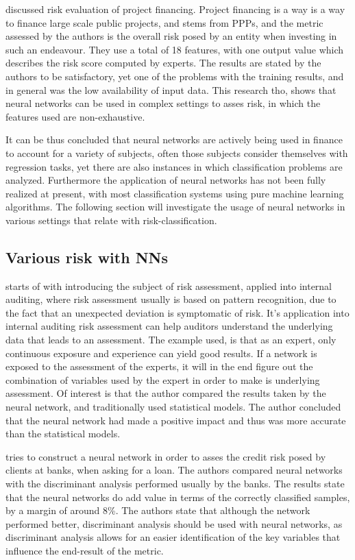 \documentclass[12pt]{article}
\begin{document}
\cite{04443437.pdf} discussed risk evaluation of project financing. Project financing is a way is a way to finance large scale public projects, and stems from PPPs, and the metric assessed by the authors is the overall risk posed by an entity when investing in such an endeavour. They use a total of 18 features, with one output value which describes the risk score computed by experts. The results are stated by the authors to be satisfactory, yet one of the problems with the training results, and in general was the low availability of input data. This research tho, shows that neural networks can be used in complex settings to asses risk, in which the features used are non-exhaustive.

It can be thus concluded that neural networks are actively being used in finance to account for a variety of subjects, often those subjects consider themselves with regression tasks, yet there are also instances in which classification problems are analyzed. Furthermore the application of neural networks has not been fully realized at present, with most classification systems using pure machine learning algorithms. The following section will investigate the usage of neural networks in various settings that relate with risk-classification.

\subsection{Various risk with NNs}
\label{sub:various_risk_nn}

\cite{riskAssesmentInternalAuditing} starts of with introducing the subject of risk assessment, applied into internal auditing, where risk assessment usually is based on pattern recognition, due to the fact that an unexpected deviation is symptomatic of risk. It's application into internal auditing risk assessment can help auditors understand the underlying data that leads to an assessment. The example used, is that as an expert, only continuous exposure and experience can yield good results. If a network is exposed to the assessment of the experts, it will in the end figure out the combination of variables used by the expert in order to make is underlying assessment. Of interest is that the author compared the results taken by the neural network, and traditionally used statistical models. The author concluded that the neural network had made a positive impact and thus was more accurate than the statistical models.

\cite{14_1_3.pdf} tries to construct a neural network in order to asses the credit risk posed by clients at banks, when asking for a loan. The authors compared neural networks with the discriminant analysis performed usually by the banks. The results state that the neural networks do add value in terms of the correctly classified samples, by a margin of around 8\%. The authors state that although the network performed better, discriminant analysis should be used with neural networks, as discriminant analysis allows for an easier identification of the key variables that influence the end-result of the metric.
\end{document}
